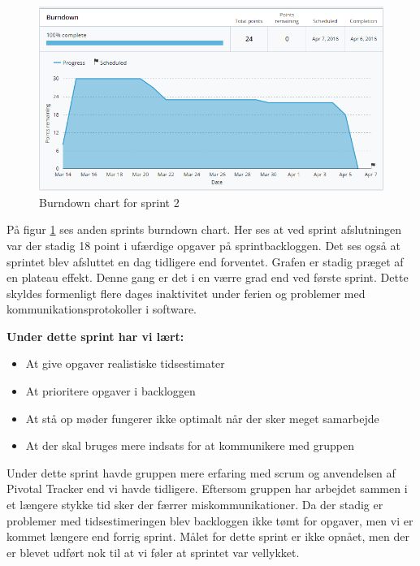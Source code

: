 	\begin{figure}[H]
		\centering
		\includegraphics[width=\textwidth]{Projektgennemfoerelse/images/burndown2}
		\caption{Burndown chart for sprint 2}
		\label{ref:Burndown2}
	\end{figure}
	
	På figur \ref{ref:Burndown2} ses anden sprints burndown chart. Her ses at ved sprint afslutningen var der stadig 18 point i ufærdige opgaver på sprintbackloggen. Det ses også at sprintet blev afsluttet en dag tidligere end forventet. Grafen er stadig præget af en plateau effekt. Denne gang er det i en værre grad end ved første sprint. Dette skyldes formenligt flere dages inaktivitet under ferien og problemer med kommunikationsprotokoller i software. \newline 

	\textbf{Under dette sprint har vi lært:}
	\begin{itemize}
		\item At give opgaver realistiske tidsestimater
		\item At prioritere opgaver i backloggen
		\item At stå op møder fungerer ikke optimalt når der sker meget samarbejde
		\item At der skal bruges mere indsats for at kommunikere med gruppen 
	\end{itemize}
	
	Under dette sprint havde gruppen mere erfaring med scrum og anvendelsen af Pivotal Tracker end vi havde tidligere. Eftersom gruppen har arbejdet sammen i et længere stykke tid sker der færrer miskommunikationer. Da der stadig er problemer med tidsestimeringen blev backloggen ikke tømt for opgaver, men vi er kommet længere end forrig sprint. Målet for dette sprint er ikke opnået, men der er blevet udført nok til at vi føler at sprintet var vellykket.
	
